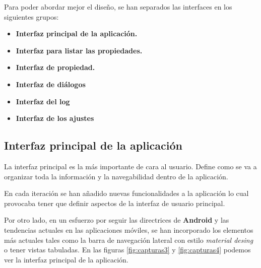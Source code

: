 \bigskip
Para poder abordar mejor el diseño, se han separados las interfaces en los siguientes grupos:

\begin{itemize}
  \item \textbf{Interfaz principal de la aplicación.}
  \item \textbf{Interfaz para listar las propiedades.}
  \item \textbf{Interfaz de propiedad.}
  \item \textbf{Interfaz de diálogos}
  \item \textbf{Interfaz del log}
  \item \textbf{Interfaz de los ajustes}
\end{itemize}

\bigskip
\subsection{Interfaz principal de la aplicación}

La interfaz principal es la más importante de cara al usuario. Define como se va a organizar toda la información y la navegabilidad dentro de la aplicación. 

\bigskip
En cada iteración se han añadido nuevas funcionalidades a la aplicación lo cual provocaba tener que definir aspectos de la interfaz de usuario principal. 

\bigskip
Por otro lado, en un esfuerzo por seguir las directrices de \textbf{Android} y las tendencias actuales en las aplicaciones móviles, se han incorporado los elementos más actuales tales como la barra de navegación lateral con estilo \textit{material desing} o tener vistas tabuladas. En las figuras \ref{fig:capturas3} y \ref{fig:capturas4} podemos ver la interfaz principal de la aplicación.

